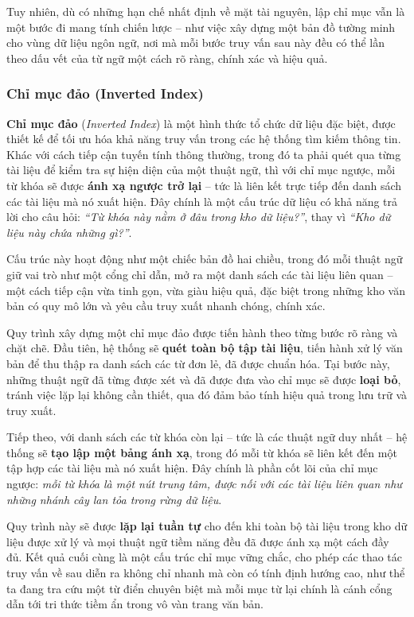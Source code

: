 Tuy nhiên, dù có những hạn chế nhất định về mặt tài nguyên, lập chỉ mục vẫn là một bước đi mang tính chiến lược -- như việc xây dựng một bản đồ tường minh cho vùng dữ liệu ngôn ngữ, nơi mà mỗi bước truy vấn sau này đều có thể lần theo dấu vết của từ ngữ một cách rõ ràng, chính xác và hiệu quả.

\subsubsection{Chỉ mục đảo (Inverted Index)}
\textbf{Chỉ mục đảo} (\textit{Inverted Index}) là một hình thức tổ chức dữ liệu đặc biệt, được thiết kế để tối ưu hóa khả năng truy vấn trong các hệ thống tìm kiếm thông tin. Khác với cách tiếp cận tuyến tính thông thường, trong đó ta phải quét qua từng tài liệu để kiểm tra sự hiện diện của một thuật ngữ, thì với chỉ mục ngược, mỗi từ khóa sẽ được \textbf{ánh xạ ngược trở lại} -- tức là liên kết trực tiếp đến danh sách các tài liệu mà nó xuất hiện. Đây chính là một cấu trúc dữ liệu có khả năng trả lời cho câu hỏi: \textit{``Từ khóa này nằm ở đâu trong kho dữ liệu?''}, thay vì \textit{``Kho dữ liệu này chứa những gì?''}.

Cấu trúc này hoạt động như một chiếc bản đồ hai chiều, trong đó mỗi thuật ngữ giữ vai trò như một cổng chỉ dẫn, mở ra một danh sách các tài liệu liên quan -- một cách tiếp cận vừa tinh gọn, vừa giàu hiệu quả, đặc biệt trong những kho văn bản có quy mô lớn và yêu cầu truy xuất nhanh chóng, chính xác.

Quy trình xây dựng một chỉ mục đảo được tiến hành theo từng bước rõ ràng và chặt chẽ. Đầu tiên, hệ thống sẽ \textbf{quét toàn bộ tập tài liệu}, tiến hành xử lý văn bản để thu thập ra danh sách các từ đơn lẻ, đã được chuẩn hóa. Tại bước này, những thuật ngữ đã từng được xét và đã được đưa vào chỉ mục sẽ được \textbf{loại bỏ}, tránh việc lặp lại không cần thiết, qua đó đảm bảo tính hiệu quả trong lưu trữ và truy xuất.

Tiếp theo, với danh sách các từ khóa còn lại -- tức là các thuật ngữ duy nhất -- hệ thống sẽ \textbf{tạo lập một bảng ánh xạ}, trong đó mỗi từ khóa sẽ liên kết đến một tập hợp các tài liệu mà nó xuất hiện. Đây chính là phần cốt lõi của chỉ mục ngược: \textit{mỗi từ khóa là một nút trung tâm, được nối với các tài liệu liên quan như những nhánh cây lan tỏa trong rừng dữ liệu}.

Quy trình này sẽ được \textbf{lặp lại tuần tự} cho đến khi toàn bộ tài liệu trong kho dữ liệu được xử lý và mọi thuật ngữ tiềm năng đều đã được ánh xạ một cách đầy đủ. Kết quả cuối cùng là một cấu trúc chỉ mục vững chắc, cho phép các thao tác truy vấn về sau diễn ra không chỉ nhanh mà còn có tính định hướng cao, như thể ta đang tra cứu một từ điển chuyên biệt mà mỗi mục từ lại chính là cánh cổng dẫn tới tri thức tiềm ẩn trong vô vàn trang văn bản.
